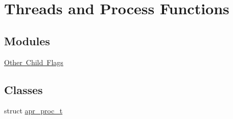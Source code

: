 \hypertarget{group__apr__thread__proc}{}\section{Threads and Process Functions}
\label{group__apr__thread__proc}
\subsection*{Modules}
\begin{DoxyCompactItemize}
\item 
\mbox{\hyperlink{group___a_p_r___o_c}{Other Child Flags}}
\end{DoxyCompactItemize}
\subsection*{Classes}
\begin{DoxyCompactItemize}
\item 
struct \mbox{\hyperlink{structapr__proc__t}{apr\+\_\+proc\+\_\+t}}
\end{DoxyCompactItemize}
